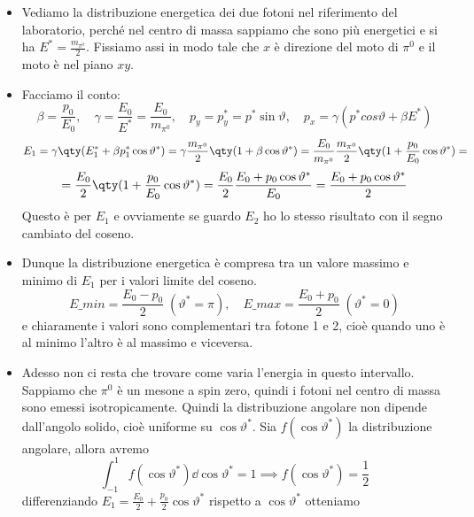 \begin{itemize}
    \item Vediamo la distribuzione energetica dei due fotoni nel riferimento del laboratorio, perché nel centro di massa sappiamo che sono più energetici e si ha $E^*=\frac{m_{\pi^0}}2$. Fissiamo assi in modo tale che $x$ è direzione del moto di $\pi^0$ e il moto è nel piano $xy$. 
    \item Facciamo il conto: 
    \begin{equation*}
        \beta=\frac{p_0}{E_0},\quad\gamma=\frac{E_0}{E^*}=\frac{E_0}{m_{\pi^0}},\quad p_y=p_y^*=p^*\sin\vartheta,\quad p_x=\gamma(p^*cos\vartheta+\beta E^*)
    \end{equation*}
    \begin{equation*}
        E_1=\gamma\qty(E_1^*+\beta p_1^*\cos\vartheta^*)=\gamma\frac{m_{\pi^0}}2\qty(1+\beta \cos\vartheta^*)=\frac{E_0}{m_{\pi^0}}\frac{m_{\pi^0}}2\qty(1+\frac{p_0}{E_0} \cos\vartheta^*)=
    \end{equation*}
    \begin{equation*}
        =\frac{E_0}2\qty(1+\frac{p_0}{E_0} \cos\vartheta^*)=\frac{E_0}2\frac{E_0+p_0\cos\vartheta^*}{E_0}=\frac{E_0+p_0\cos\vartheta^*}{2}
    \end{equation*}
    Questo è per $E_1$ e ovviamente se guardo $E_2$ ho lo stesso risultato con il segno cambiato del coseno. 
    \item Dunque la distribuzione energetica è compresa tra un valore massimo e minimo di $E_1$ per i valori limite del coseno. 
    \begin{equation*}
        E\_{min}=\frac{E_0-p_0}{2}\;(\vartheta^*=\pi),\quad E\_{max}=\frac{E_0+p_0}{2}\;(\vartheta^*=0)
    \end{equation*}
    e chiaramente i valori sono complementari tra fotone 1 e 2, cioè quando uno è al minimo l'altro è al massimo e viceversa.
    \item Adesso non ci resta che trovare come varia l'energia in questo intervallo. Sappiamo che $\pi^0$ è un mesone a spin zero, quindi i fotoni nel centro di massa sono emessi isotropicamente. Quindi la distribuzione angolare non dipende dall'angolo solido, cioè uniforme su $\cos\vartheta^*$. Sia $f(\cos\vartheta^*)$ la distribuzione angolare, allora avremo
    \begin{equation*}
        \int_{-1}^1f(\cos\vartheta^*)\dd{\cos\vartheta^*}=1\implies f(\cos\vartheta^*)=\frac12
    \end{equation*}
    differenziando $E_1=\frac{E_0}2+\frac{p_0}2\cos\vartheta^*$ rispetto a $\cos\vartheta^*$ otteniamo
    \begin{equation*}

\end{equation*}
\end{itemize}
